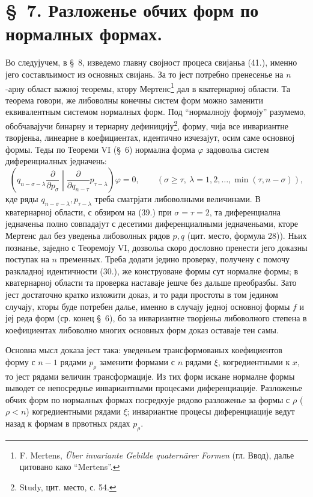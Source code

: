 ﻿\documentclass[11pt]{article}
\begin{document}
\section*{\S\ 7. Разложенье обчих форм по нормалных формах.}

Во следујучем, в \S\ 8, изведемо главну својност процеса свијаньа (41.), именно јего составльимост из основных свијань. За то јест потребно пренесенье на $n$-арну област важној теоремы, ктору Мертенс\footnote{F. Mertens, \emph{\"Uber invariante Gebilde quatern\"arer Formen} (гл. Ввод), далье цитовано како ``Mertens''.} дал в кватернарној области. Та теорема говори, же либоволны конечны систем форм можно заменити еквивалентным системом нормалных форм. Под ``нормалноју формоју'' разумемо, обобчавајучи бинарну и тернарну дефиницију\footnote{Study, цит. место, с. 54.}, форму, чија все инвариантне творјеньа, линеарне в коефициентах, идентично изчезајут, осим саме основној формы. Теды по Теореми VI (\S\ 6) нормална форма $\varphi$ задовольа систем диференциалных једначень:
\begin{equation}
 \left(q_{n-\sigma-\lambda}\frac{\partial}{\partial p_\sigma}\middle|\frac{\partial}{\partial q_{n-\tau}}p_{\tau-\lambda}\right)\varphi=0,
 \qquad(\sigma\ge\tau,\ \lambda=1,2,\ldots,\min(\tau,n-\sigma)),
\tag{46}
\end{equation}
кде ряды $q_{n-\sigma-\lambda},p_{\tau-\lambda}$ треба сматрјати либоволными величинами. В кватернарној области, с обзиром на (39.) при $\sigma=\tau=2$, та диференциална једначеньа полно совпадајут с десетими диференциалными једначеньами, кторе Мертенс дал без уведеньа либоволных рядов $p,q$ (цит. место, формула 28)). Ньих познанье, заједно с Теоремоју VI, дозвольа скоро дословно пренести јего доказны поступак на $n$ пременных. Треба додати једино проверку, получену с помочу разкладној идентичности (30.), же конструоване формы сут нормалне формы; в кватернарној области та проверка наставаје јешче без дальше преобразбы. Зато јест достаточно кратко изложити доказ, и то ради простоты в том једином случају, кторы буде потребен далье, именно в случају једној основној формы $f$ и јеј реда форм (ср. конец \S\ 6), бо за инвариантне творјеньа либоволного степена в коефициентах либоволно многих основных форм доказ оставаје тен самы.

Основна мысл доказа јест така: уведеньем трансформованых коефициентов форму с $n-1$ рядами $p_\rho$ заменити формами с $n$ рядами $\xi$, когредиентными к $x$, то јест рядами величин трансформације. Из тих форм искане нормалне формы выводет се непосреднье инвариантными процесами диференциације. Разложенье обчих форм по нормалных формах посредкује рядово разложенье за формы с $\rho$ ($\rho<n$) когредиентными рядами $\xi$; инвариантне процесы диференциације ведут назад к формам в првотных рядах $p_\rho$.
\end{document}
